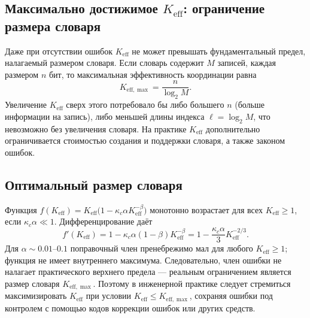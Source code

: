 \documentclass[12pt,a4paper]{article}
\theoremstyle{remark}
\newcommand{\Keff}{K_{\mathrm{eff}}}
\newcommand{\Keffmax}{K_{\mathrm{eff},\max}}
\begin{document}
	\subsection{Максимально достижимое $\Keff$: ограничение размера словаря}
	
	Даже при отсутствии ошибок $\Keff$ не может превышать фундаментальный предел, налагаемый размером словаря. Если словарь содержит $M$ записей, каждая размером $n$ бит, то максимальная эффективность координации равна
	\begin{equation}
		\Keffmax = \frac{n}{\log_2 M}. \label{eq:keff-max}
	\end{equation}
	Увеличение $\Keff$ сверх этого потребовало бы либо большего $n$ (больше информации на запись), либо меньшей длины индекса $\ell = \log_2 M$, что невозможно без увеличения словаря. На практике $\Keff$ дополнительно ограничивается стоимостью создания и поддержки словаря, а также законом ошибок.
	
	\subsection{Оптимальный размер словаря}
	
	Функция $f(\Keff) = \Keff \bigl(1 - \kappa_c \alpha K_{\mathrm{eff}}^{-\beta}\bigr)$ монотонно возрастает для всех $\Keff \ge 1$, если $\kappa_c\alpha \ll 1$. Дифференцирование даёт
	\[
	f'(\Keff) = 1 - \kappa_c\alpha(1-\beta)K_{\mathrm{eff}}^{-\beta} = 1 - \frac{\kappa_c\alpha}{3} K_{\mathrm{eff}}^{-2/3}.
	\]
	Для $\alpha \sim 0.01$–$0.1$ поправочный член пренебрежимо мал для любого $\Keff \ge 1$; функция не имеет внутреннего максимума. Следовательно, член ошибки не налагает практического верхнего предела — реальным ограничением является размер словаря $\Keffmax$. Поэтому в инженерной практике следует стремиться максимизировать $\Keff$ при условии $\Keff \le \Keffmax$, сохраняя ошибки под контролем с помощью кодов коррекции ошибок или других средств.
	
\end{document}
